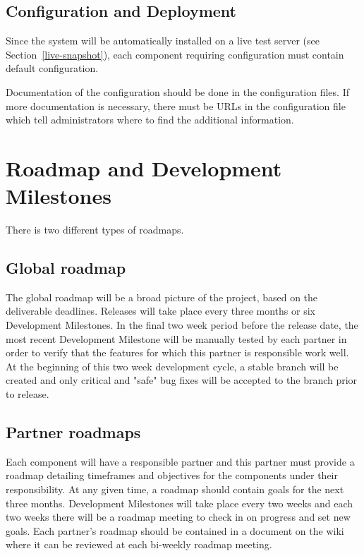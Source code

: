 \subsection{Configuration and Deployment}
\label{sec:deployment-process}

Since the system will be automatically installed on a live test server
(see Section~\ref{live-snapshot}), each component requiring configuration must contain
default configuration.

Documentation of the configuration should be done in the configuration files. If more
documentation is necessary, there must be URLs in the configuration file which tell
administrators where to find the additional information.

\section{Roadmap and Development Milestones}
\label{sec:roadmap}

There is two different types of roadmaps.

\subsection{Global roadmap}
\label{sec:global-roadmap}

The global roadmap will be a broad picture of the project, based on the deliverable
deadlines. Releases will take place every three months or six Development Milestones.
In the final two week period before the release date, the most recent Development
Milestone will be manually tested by each partner in order to verify that the
features for which this partner is responsible work well. At the beginning of this
two week development cycle, a stable branch will be created and only critical and
"safe" bug fixes will be accepted to the branch prior to release.

\subsection{Partner roadmaps}
\label{sec:partner-roadmaps}

Each component will have a responsible partner and this partner must provide a roadmap
detailing timeframes and objectives for the components under their responsibility. At any
given time, a roadmap should contain goals for the next three months.
Development Milestones will take place every two weeks and each two weeks there will be
a roadmap meeting to check in on progress and set new goals. Each partner's roadmap
should be contained in a document on the wiki where it can be reviewed at each bi-weekly
roadmap meeting.

